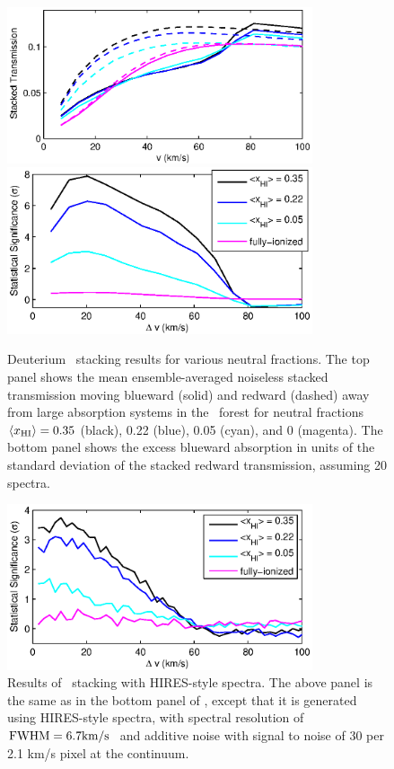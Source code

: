 \begin{figure}[t]
  \centering
  \includegraphics[width=9cm]{fig9a.eps}
  \includegraphics[width=9cm]{fig9b.eps}
  \caption{Deuterium \lyb\ stacking results for various neutral fractions. The top panel shows the mean ensemble-averaged noiseless stacked transmission moving blueward (solid) and redward (dashed) away from large absorption systems in the \lyb\ forest for neutral fractions $\langle x_{\text{HI}}\rangle = 0.35$ (black), 0.22 (blue), 0.05 (cyan), and 0 (magenta). The bottom panel shows the excess blueward absorption in units of the standard deviation of the stacked redward transmission, assuming 20 spectra. }
  \label{fig:LybResults}
\end{figure}


\begin{figure}[!ht]
  \centering
  \includegraphics[width=9cm]{fig10.eps}
  \caption{Results of \lyb\ stacking with HIRES-style spectra. The above panel is the same as in the bottom panel of , except that it is generated using HIRES-style spectra, with spectral resolution of $\text{FWHM}=6.7\text{km}/\text{s}\ $ and additive noise with signal to noise of 30 per 2.1 km/s pixel at the continuum. }
  \label{fig:LybResults_Noisy}
\end{figure}




